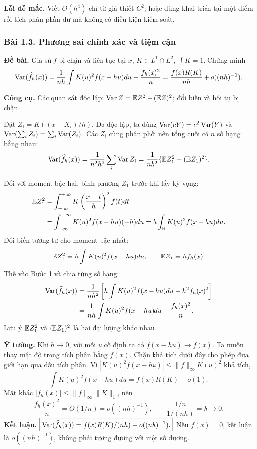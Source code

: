 \textbf{Lỗi dễ mắc.} Viết $O(h^4)$ chỉ từ giả thiết $C^2$;
hoặc dùng khai triển tại một điểm rồi tích phân phần dư mà không có điều kiện kiểm soát.

\subsubsection*{Bài 1.3. Phương sai chính xác và tiệm cận}\label{ot45:kde-variance}
\textbf{Đề bài.} Giả sử $f$ bị chặn và liên tục tại $x$,
$K\in L^1\cap L^2$, $\int K=1$. Chứng minh
\[
\operatorname{Var}(\widehat f_h(x))
=\frac1{nh}\int K(u)^2f(x-hu)du-\frac{f_h(x)^2}{n}
=\frac{f(x)R(K)}{nh}+o((nh)^{-1}).
\]

\textbf{Công cụ.} Các quan sát độc lập; $\operatorname{Var} Z=\mathbb E Z^2-(\mathbb E Z)^2$;
đổi biến và hội tụ bị chặn.

Đặt $Z_i=K((x-X_i)/h)$. Do độc lập,
ta dùng $\operatorname{Var}(cY)=c^2\operatorname{Var}(Y)$ và
$\operatorname{Var}(\sum_iZ_i)=\sum_i\operatorname{Var}(Z_i)$.
Các $Z_i$ cùng phân phối nên tổng cuối có $n$ số hạng bằng nhau:
\[
\operatorname{Var}(\widehat f_h(x))=\frac{1}{n^2h^2}\sum_i\operatorname{Var} Z_i
=\frac{1}{nh^2}\{\mathbb E Z_1^2-(\mathbb E Z_1)^2\}.
\]

Đối với moment bậc hai, bình phương $Z_1$ trước khi lấy kỳ vọng:
\begin{align*}
\mathbb E Z_1^2
&=\int_{-\infty}^{+\infty}K\left(\frac{x-t}{h}\right)^2f(t)dt\\
&=\int_{+\infty}^{-\infty}K(u)^2f(x-hu)(-h)du
=h\int_{\mathbb R}K(u)^2f(x-hu)du.
\end{align*}
Đổi biến tương tự cho moment bậc nhất:
\[
\mathbb E Z_1^2=h\int K(u)^2f(x-hu)du,\qquad \mathbb E Z_1=hf_h(x).
\]
Thế vào Bước 1 và chia từng số hạng:
\begin{align*}
\operatorname{Var}(\widehat f_h(x))
&=\frac1{nh^2}\left[h\int K(u)^2f(x-hu)du-h^2f_h(x)^2\right]\\
&=\frac1{nh}\int K(u)^2f(x-hu)du-\frac{f_h(x)^2}{n}.
\end{align*}
Lưu ý $\mathbb E Z_1^2$ và $(\mathbb E Z_1)^2$ là hai đại lượng khác nhau.

\textbf{Ý tưởng.} Khi $h\to0$, với mỗi $u$ cố định ta có
$f(x-hu)\to f(x)$. Ta muốn thay mật độ trong tích phân bằng $f(x)$.
Chặn khả tích dưới đây cho phép đưa giới hạn qua dấu tích phân.
Vì $|K(u)^2f(x-hu)|\leq\|f\|_\infty K(u)^2$ khả tích,
\[
\int K(u)^2f(x-hu)du=f(x)R(K)+o(1).
\]
Mặt khác $|f_h(x)|\leq\|f\|_\infty\|K\|_1$, nên
\[
\frac{f_h(x)^2}{n}=O(1/n)=o((nh)^{-1}),
\qquad\frac{1/n}{1/(nh)}=h\to0.
\]
\textbf{Kết luận.} $\boxed{\operatorname{Var}(\widehat f_h(x))=f(x)R(K)/(nh)+o((nh)^{-1}).}$
Nếu $f(x)=0$, kết luận là $o((nh)^{-1})$, không phải tương đương với một số dương.

